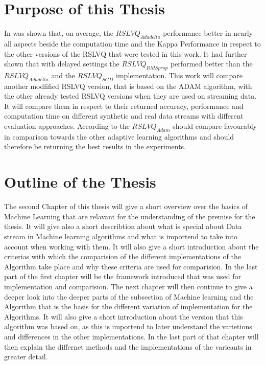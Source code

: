 \documentclass[12pt,oneside,a4paper,parskip]{scrbook}
\begin{document}
\section{Purpose of this Thesis} 
In \cite{PassiveDriftonRSLVQ} was shown that, on average, the $RSLVQ_\textit{Adadelta}$ performance better in nearly
all aspects beside the computation time and the Kappa Performance in respect to the other versions of the RSLVQ 
that were tested in this work.
It had further shown that with delayed settings the $RSLVQ_\textit{RMSprop}$ performed better than the $RSLVQ_\textit{Adadelta}$
and the $RSLVQ_\textit{SGD}$ implementation.
This work will compare another modfified RSLVQ version, that is based on the ADAM algorithm, with the other already tested
RSLVQ versions when they are used on streaming data. It will compare them in respect to their returned accuracy,
performance and computation time on different synthetic and real data streams with different evaluation approaches.
According to \cite{Kingma2014AdamAM} the $RSLVQ_\textit{Adam}$ should compare favourably in comparison towards the
other adaptive learning algorithms and should therefore be returning the best results in the experiments.


\section{Outline of the Thesis} 

The second Chapter of this thesis will give a short overview over the basics of Machine Learning that are relavant for
the understanding of the premise for the thesis. It will give also a short describtion about what is special about Data stream 
in Machine learning algorithms and what is importend to take into account when working with them.
It will also give a short introduction about the criterias with which the comparision of the different implementations 
of the Algorithm take place and why these criteria are used for  comparision.
In the last part of the first chapter will be the framework introduced that was used for implementation and comparision.
The next chapter will then continue to give a deeper look into the deeper parts of the subsection of Machine learning 
and the Algorithm that is the basis for the different variation of implementation for the Algorithms.
It will also give a short introduction about the version that this algorithm was based on, as this is importend to later understand
the varietions and differences in the other implementations.
In the last part of that chapter will then explain the differnet methods and the implementations of the varieants in greater detail.
\end{document}
